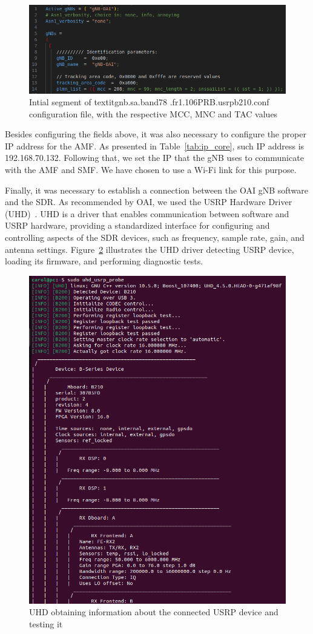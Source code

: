 \begin{figure}[H]
    \centering
    \includegraphics[width=0.7\linewidth]{figures/gnb_conf}
    \caption{Intial segment of textit{gnb.sa.band78
    .fr1.106PRB.usrpb210.conf} configuration file, with the respective MCC, MNC and TAC values}
    \label{fig:gnb_conf}
\end{figure}

Besides configuring the fields above, it was also necessary to configure the proper IP address for the AMF\@.
As presented in Table~\ref{tab:ip_core}, such IP address is 192.168.70.132.
Following that, we set the IP that the gNB uses to communicate with the AMF and SMF\@.
We have chosen to use a Wi-Fi link for this purpose.


Finally, it was necessary to establish a connection between the OAI gNB software and the SDR\@.
As recommended by OAI, we used the USRP Hardware Driver (UHD)~\cite{uhdusrpdriver}.
UHD is a driver that enables communication between software and USRP hardware, providing a standardized interface for configuring and controlling aspects of the SDR devices, such as frequency, sample rate, gain, and antenna settings.
Figure~\ref{fig:uhd_probe} illustrates the UHD driver detecting USRP device, loading its firmware, and performing diagnostic tests.

\begin{figure}[H]
    \centering
    \includegraphics[width=0.5\linewidth]{figures/uhd_usrp_probe}
    \caption{UHD obtaining information about the connected USRP device and testing it}
    \label{fig:uhd_probe}
\end{figure}

